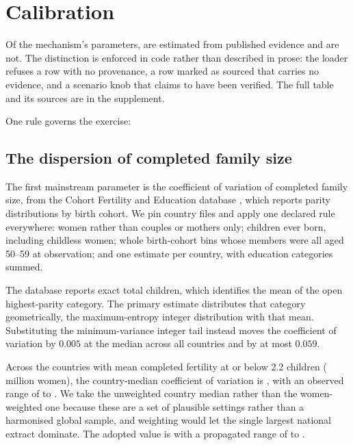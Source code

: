 \section{Calibration}
\label{sec:calibration}

Of the mechanism's \MechanismParameterCount{} parameters,
\MechanismSourcedCount{} are estimated from published evidence and
\MechanismKnobCount{} are not. The distinction is enforced in code rather than
described in prose: the loader refuses a row with no provenance, a row marked as
sourced that carries no evidence, and a scenario knob that claims to have been
verified. The full table and its sources are in the supplement.

One rule governs the exercise:


\subsection{The dispersion of completed family size}
\label{sec:cv}

The first mainstream parameter is the coefficient of variation of completed
family size, from the Cohort Fertility and Education database \citep{cfe2017},
which reports parity distributions by birth cohort. We pin \CVAllCountries{}
country files and apply one declared rule everywhere: women rather than couples
or mothers only; children ever born, including childless women; whole
birth-cohort bins whose members were all aged 50--59 at observation; and one
estimate per country, with education categories summed.

The database reports exact total children, which identifies the mean of the open
highest-parity category. The primary estimate distributes that category
geometrically, the maximum-entropy integer distribution with that mean.
Substituting the minimum-variance integer tail instead moves the coefficient of
variation by $0.005$ at the median across all \CVAllCountries{} countries and by
at most $0.059$.

Across the \CVCountries{} countries with mean completed fertility at or below 2.2
children (\CVWomenMillions{} million women), the country-median coefficient of
variation is \CVMedian{}, with an observed range of \CVMin{} to \CVMax{}. We take
the unweighted country median rather than the women-weighted one because these
are a set of plausible settings rather than a harmonised global sample, and
weighting would let the single largest national extract dominate. The adopted
value is \FamilySizeCV{} with a propagated range of \FamilySizeCVLow{} to
\FamilySizeCVHigh{}.

